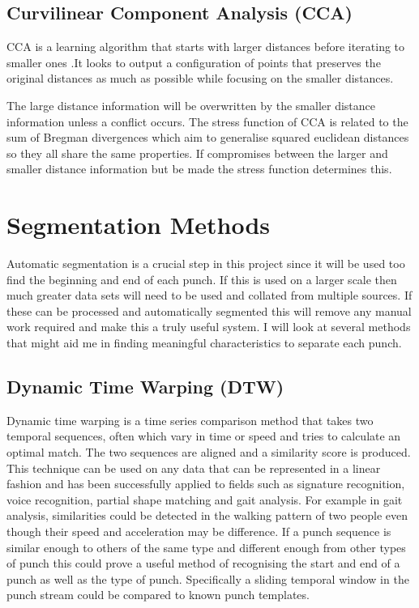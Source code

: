 \subsection{Curvilinear Component Analysis (CCA)}
CCA is a learning algorithm that starts with larger distances before iterating to smaller ones \cite{Demartines1997} .It looks to output a configuration of points that preserves the original distances as much as possible while focusing on the smaller distances.

The large distance information will be overwritten by the smaller distance information unless a conflict occurs. The stress function of CCA is related to the sum of Bregman divergences which aim to generalise squared euclidean distances so they all share the same properties. If compromises between the larger and smaller distance information but be made the stress function determines this.

\section{Segmentation Methods}
Automatic segmentation is a crucial step in this project since it will be used too find the beginning and end of each punch. If this is used on a larger scale then much greater data sets will need to be used and collated from multiple sources. If these can be processed and automatically segmented this will remove any manual work required and make this a truly useful system. I will look at several methods that might aid me in finding meaningful characteristics to separate each punch.

\subsection{Dynamic Time Warping (DTW)}
Dynamic time warping is a time series comparison method that takes two temporal sequences, often which vary in time or speed and tries to calculate an optimal match. The two sequences are aligned and a similarity score is produced. This technique can be used on any data that can be represented in a linear fashion and has been successfully applied to fields such as signature recognition, voice recognition, partial shape matching and gait analysis. For example in gait analysis, similarities could be detected in the walking pattern of two people even though their speed and acceleration may be difference.
If a punch sequence is similar enough to others of the same type and different enough from other types of punch this could prove a useful method of recognising the start and end of a punch as well as the type of punch. Specifically a sliding temporal window in the punch stream could be compared to known punch templates.


